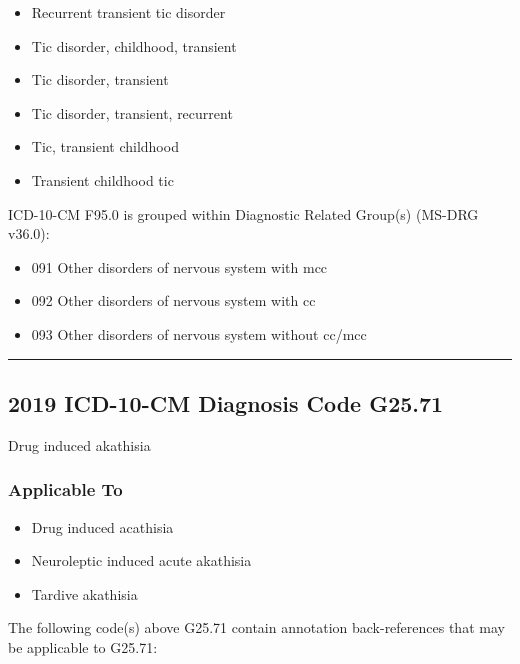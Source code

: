 \begin{paracol}{2}
\begin{leftcolumn}
\begin{itemize}
\tightlist
\item
  Recurrent transient tic disorder
\item
  Tic disorder, childhood, transient
\item
  Tic disorder, transient
\item
  Tic disorder, transient, recurrent
\item
  Tic, transient childhood
\item
  Transient childhood tic
\end{itemize}

\noindent ICD-10-CM F95.0 is grouped within Diagnostic Related Group(s) (MS-DRG v36.0):

\begin{itemize}
\tightlist
\item
  091 Other disorders of nervous system with mcc
\item
  092 Other disorders of nervous system with cc
\item
  093 Other disorders of nervous system without cc/mcc
\end{itemize}

\begin{center}\rule{0.5\linewidth}{\linethickness}\end{center}

\hypertarget{icd-10-cm-diagnosis-code-g25.71}{%
\subsection{2019 ICD-10-CM Diagnosis Code G25.71}\label{icd-10-cm-diagnosis-code-g25.71}}

\noindent Drug induced akathisia

\hypertarget{applicable-to-1}{%
\subsubsection{Applicable To}\label{applicable-to-1}}

\begin{itemize}
\tightlist
\item
  Drug induced acathisia
\item
  Neuroleptic induced acute akathisia
\item
  Tardive akathisia
\end{itemize}

\noindent The following code(s) above G25.71 contain annotation back-references that may be applicable to G25.71:


\end{leftcolumn}
\end{paracol}
